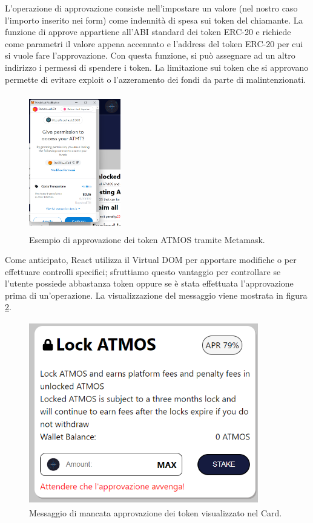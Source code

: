 L'operazione di approvazione consiste nell'impostare un valore (nel nostro caso l'importo inserito nei form) come indennità di spesa sui token del chiamante. La funzione di approve appartiene all'ABI standard dei token ERC-20 e richiede come parametri il valore appena accennato e l'address del token ERC-20 per cui si vuole fare l'approvazione.  Con questa funzione, si può assegnare ad un altro indirizzo i permessi di spendere i token. La limitazione sui token che si approvano permette di evitare exploit o l’azzeramento dei fondi da parte di malintenzionati.
\begin{figure}[h]
    \centering
    \includegraphics[width=4cm,height=6cm]{Immagini/approve.png}
    \caption[Schermata di approvazione dei token ATMOS]{Esempio di approvazione dei token ATMOS tramite Metamask.}
    \label{approve}
\end{figure}
Come anticipato, React utilizza il Virtual DOM per apportare modifiche o per effettuare controlli specifici; sfruttiamo questo vantaggio per controllare se l'utente possiede abbastanza token oppure se è stata effettuata l'approvazione prima di un'operazione. La visualizzazione del messaggio viene mostrata in figura \ref{controllo}.

\begin{figure}[h]
    \centering
    \includegraphics[width=10cm,height=8cm]{Immagini/Controllo.png}
    \caption[Schermata di warning per la mancata approvazione dei token]{Messaggio di mancata approvazione dei token visualizzato nel Card.}
    \label{controllo}
\end{figure}

